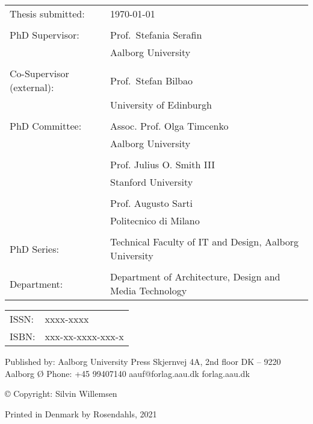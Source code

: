 \thispagestyle{empty}
\noindent
\begin{tabularx}{\textwidth}{@{}lX}
    Thesis submitted: & \today\\
    \\
    PhD Supervisor: & Prof.\ Stefania Serafin\\
                    & Aalborg University\\
                    \\
    Co-Supervisor (external): & Prof.\ Stefan Bilbao\\
                    & University of Edinburgh\\
                    \\
    PhD Committee:  & Assoc. Prof. Olga Timcenko\\
                    & Aalborg University\\
                    \\
                    & Prof. Julius O. Smith III \\
                    & Stanford University\\
                    \\
                    & Prof. Augusto Sarti\\
                    & Politecnico di Milano\\
                   \\
    PhD Series:    & Technical Faculty of IT and Design, Aalborg University\\
    \\
    Department: & Department of Architecture, Design and Media Technology
\end{tabularx}
\strut\vfill
\noindent
\begin{tabularx}{\textwidth}{@{}lX}
    ISSN: & xxxx-xxxx\\
    ISBN: & xxx-xx-xxxx-xxx-x\\
\end{tabularx}
\strut\vfill
\noindent Published by:\newline
Aalborg University Press\newline
Skjernvej 4A, 2nd floor\newline
DK – 9220 Aalborg Ø\newline
Phone: +45 99407140\newline
aauf@forlag.aau.dk\newline
forlag.aau.dk
\strut\vfill
\noindent \copyright{} Copyright: Silvin Willemsen\newline
\strut\vfill
\noindent Printed in Denmark by Rosendahls, 2021
\clearpage

